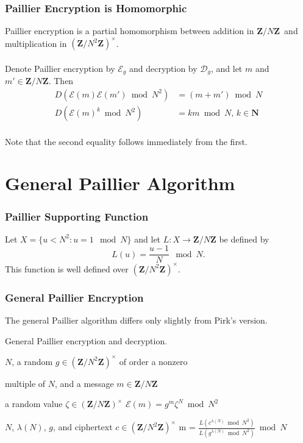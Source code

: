\documentclass{beamer}
\makeatletter
\newcommand{\Z}{\ensuremath{\mathbf{Z}}}
\newcommand{\zmodn}{\ensuremath{\Z/N\Z}}
\newcommand{\zmodntunits}{\ensuremath{\left(\Z/N^{2}\Z\right)^{\times}}}
\DeclareRobustCommand*{\&}{%
  \nfss@text{%
    \fontfamily{LinuxBiolinumT-TLF}%
    \selectfont
    \symbol{`\&}%
  }%
}
\makeatother
\begin{document}
\begin{frame}
  \frametitle{Paillier Encryption is Homomorphic}
  Paillier encryption is a partial homomorphism between addition in \zmodn\ and
  multiplication in \zmodntunits.\\~\\

  Denote Paillier encryption by $\mathcal{E}_g$ and decryption by $\mathcal{D}_g$,
  and let $m$ and $m'\in \zmodn$. Then 
    \begin{align*}
        D(\mathcal{E}(m) \mathcal{E}(m') \bmod N^2) &= (m + m') \bmod N \\
        D(\mathcal{E}(m)^k \bmod N^2) &= km \bmod N, \, k \in \mathbf{N}
    \end{align*}
    ~\\
    Note that the second equality follows immediately from the first.
\end{frame}

\section{General Paillier Algorithm}

\begin{frame}
\frametitle{Paillier Supporting Function}
Let $X=\{u<N^2 : u = 1 \mod N\}$ and let $L:X\rightarrow \zmodn$ be
defined by 
\begin{equation*}L(u) = \frac{u-1}{N} \mod N.\end{equation*}
This function is well defined over \zmodntunits.
\end{frame}

\begin{frame}
\frametitle{General Paillier Encryption}
The general Paillier algorithm differs only slightly from Pirk's version.
\begin{algorithm}[H]
  \caption{General Paillier encryption and decryption.}\label{alg.paillier_encrypt_original}
  \begin{algorithmic}[1]
    \State \begin{varwidth}[t]{\linewidth}
      \Given \(N\), a random \(g \in \zmodntunits\) of order a nonzero\par
  multiple of $N$, and a message \(m\in\zmodn\)
      \end{varwidth}
    \State \Select a random value \(\zeta\in \left(\zmodn\right)^{\times}\)
    \State \Return \(\mathcal{E}(m) = g^m \zeta^{N}\bmod{N^{2}}\)
    \EndProcedure
  \end{algorithmic}
  \begin{algorithmic}[1]
    \State \Given \(N\), \(\lambda(N)\), \(g\), and ciphertext \(c \in \zmodntunits\)
    \State \Return m = \(\frac{L( c^{\lambda(N)}\bmod N^{2})}{L( g^{\lambda(N)}\bmod N^{2})}\bmod N\)
    \EndProcedure
  \end{algorithmic}
\end{algorithm}
\end{frame}
\end{document}
